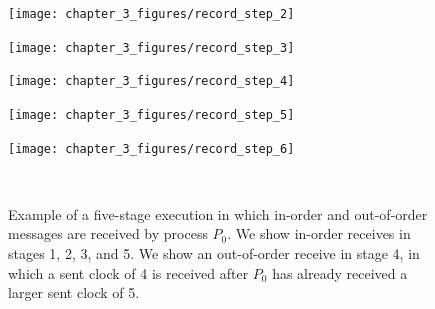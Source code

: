 \begin{figure} [!htb]
    \centering
    \begin{minipage}{0.20\textwidth}
        \texttt{[image: chapter\_3\_figures/record\_step\_2]}
        \label{fig:record_step_2}
    \end{minipage}%
    \begin{minipage}{0.20\textwidth}
        \texttt{[image: chapter\_3\_figures/record\_step\_3]}
        \label{fig:record_step_3}
    \end{minipage}%
   \begin{minipage}{0.20\textwidth}
        \texttt{[image: chapter\_3\_figures/record\_step\_4]}
        \label{fig:record_step_4}
    \end{minipage}%
    \begin{minipage}{0.20\textwidth}
        \texttt{[image: chapter\_3\_figures/record\_step\_5]}
        \label{fig:record_step_5}
    \end{minipage}%
    \begin{minipage}{0.20\textwidth}
        \texttt{[image: chapter\_3\_figures/record\_step\_6]}
        \label{fig:record_step_6}
    \end{minipage}%
\\
    \begin{minipage}{0.20\textwidth}
        \label{fig:received_clocks_2}
    \end{minipage}%
    \begin{minipage}{0.20\textwidth}
        \label{fig:received_clocks_3}
    \end{minipage}%
    \begin{minipage}{0.20\textwidth}
        \label{fig:received_clocks_4}
    \end{minipage}%
    \begin{minipage}{0.20\textwidth}
        \label{fig:received_clocks_5}
    \end{minipage}%
    \begin{minipage}{0.20\textwidth}
        \label{fig:received_clocks_6}
    \end{minipage}%
    \caption{Example of a five-stage execution in which in-order and out-of-order
      messages are received by process $P_0$. We show in-order receives in stages 
      1, 2, 3, and 5. We show an out-of-order receive in stage 4, in which a sent
      clock of 4 is received after $P_0$ has already received a larger sent clock
      of 5.}
    \label{fig:exampleinandout}
\end{figure}

